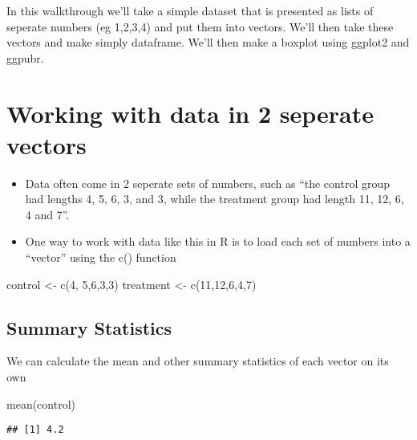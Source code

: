 \documentclass[
]{book}
\newenvironment{Shaded}{\begin{snugshade}}{\end{snugshade}}
\newcommand{\DecValTok}[1]{\textcolor[rgb]{0.00,0.00,0.81}{#1}}
\newcommand{\FunctionTok}[1]{\textcolor[rgb]{0.00,0.00,0.00}{#1}}
\newcommand{\NormalTok}[1]{#1}
\newcommand{\OtherTok}[1]{\textcolor[rgb]{0.56,0.35,0.01}{#1}}
\providecommand{\tightlist}{%
  \setlength{\itemsep}{0pt}\setlength{\parskip}{0pt}}
\begin{document}
In this walkthrough we'll take a simple dataset that is presented as lists of seperate numbers (eg 1,2,3,4) and put them into vectors. We'll then take these vectors and make simply dataframe. We'll then make a boxplot using ggplot2 and ggpubr.

\hypertarget{working-with-data-in-2-seperate-vectors}{%
\section{Working with data in 2 seperate vectors}\label{working-with-data-in-2-seperate-vectors}}

\begin{itemize}
\tightlist
\item
  Data often come in 2 seperate sets of numbers, such as ``the control group had lengths 4, 5, 6, 3, and 3, while the treatment group had length 11, 12, 6, 4 and 7''.
\item
  One way to work with data like this in R is to load each set of numbers into a ``vector'' using the c() function
\end{itemize}

\begin{Shaded}
\begin{Highlighting}[]
\NormalTok{control }\OtherTok{\textless{}{-}}   \FunctionTok{c}\NormalTok{(}\DecValTok{4}\NormalTok{,  }\DecValTok{5}\NormalTok{,}\DecValTok{6}\NormalTok{,}\DecValTok{3}\NormalTok{,}\DecValTok{3}\NormalTok{)}
\NormalTok{treatment }\OtherTok{\textless{}{-}} \FunctionTok{c}\NormalTok{(}\DecValTok{11}\NormalTok{,}\DecValTok{12}\NormalTok{,}\DecValTok{6}\NormalTok{,}\DecValTok{4}\NormalTok{,}\DecValTok{7}\NormalTok{)}
\end{Highlighting}
\end{Shaded}

\hypertarget{summary-statistics}{%
\subsection{Summary Statistics}\label{summary-statistics}}

We can calculate the mean and other summary statistics of each vector on its own

\begin{Shaded}
\begin{Highlighting}[]
\FunctionTok{mean}\NormalTok{(control)}
\end{Highlighting}
\end{Shaded}

\begin{verbatim}
## [1] 4.2
\end{verbatim}
\end{document}
